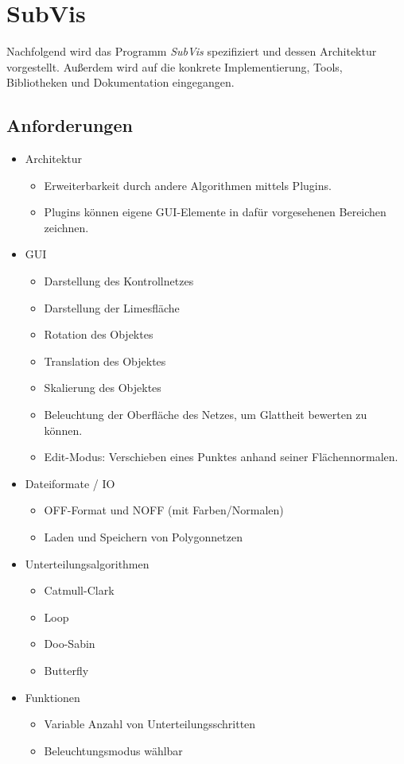 \chapter{SubVis}

Nachfolgend wird das Programm \emph{SubVis} spezifiziert und dessen Architektur vorgestellt.
Außerdem wird auf die konkrete Implementierung, Tools, Bibliotheken und Dokumentation eingegangen.

\section{Anforderungen}

\begin{itemize}
 \item Architektur
 \begin{itemize}
 	\item Erweiterbarkeit durch andere Algorithmen mittels Plugins.
 	\item Plugins können eigene GUI-Elemente in dafür vorgesehenen Bereichen zeichnen.
 \end{itemize}
 \item GUI
  \begin{itemize}
 	\item Darstellung des Kontrollnetzes
 	\item Darstellung der Limesfläche
 	\item Rotation des Objektes
 	\item Translation des Objektes
 	\item Skalierung des Objektes
 	\item Beleuchtung der Oberfläche des Netzes, um Glattheit bewerten zu können.
 	\item Edit-Modus: Verschieben eines Punktes anhand seiner Flächennormalen.

 \end{itemize}
 \item Dateiformate / IO
 \begin{itemize}
 	\item OFF-Format und NOFF (mit Farben/Normalen)
 	\item Laden und Speichern von Polygonnetzen
 \end{itemize}
 \item Unterteilungsalgorithmen
 \begin{itemize}
 	\item Catmull-Clark
 	\item Loop
 	\item Doo-Sabin
 	\item Butterfly
 \end{itemize}
 \item Funktionen
 \begin{itemize}
  \item Variable Anzahl von Unterteilungsschritten
  \item Beleuchtungsmodus wählbar
 \end{itemize}
\end{itemize}

